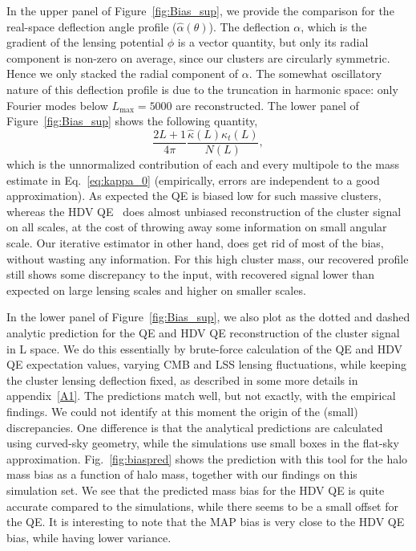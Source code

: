\documentclass[prd, superscriptaddress, tightenlines, longbibliography, nofootinbib, eqsecnum, amsfonts, amsmath, floatfix, twocolumn, notitlepage]{revtex4-2}
\begin{document}
In the upper panel of Figure~\ref{fig:Bias_sup}, we provide the comparison for the real-space deflection angle profile ($\hat \alpha(\theta)$). 
The deflection $\alpha$, which is the gradient of the lensing potential $\phi$ is a vector quantity, but only its radial component is non-zero on average, since our clusters are circularly symmetric. 
Hence we only stacked the radial component of $\alpha$. The somewhat oscillatory nature of this deflection profile is due to the truncation in harmonic space: only Fourier modes below $L_{\text{max}}=5000$ are reconstructed.
The lower panel of Figure~\ref{fig:Bias_sup} shows the following quantity,
\begin{equation}\label{Eq:Int_kappa0}
	\frac{2L + 1}{4\pi} \frac{\hat \kappa(L) \kappa_t(L)}{N(L)},
\end{equation}
which is the unnormalized contribution of each and every multipole to the mass estimate in Eq.~\ref{eq:kappa_0} (empirically, errors are independent to a good approximation). As expected the QE is biased low for such massive clusters, whereas the HDV QE~\cite{Hu:2007bt} does almost unbiased reconstruction of the cluster signal on all scales, at the cost of throwing away some information on small angular scale.
Our iterative estimator in other hand, does get rid of most of the bias, without wasting any information. For this high cluster mass, our recovered profile still shows some discrepancy to the input, with recovered signal lower than expected on large lensing scales and higher on smaller scales.

In the lower panel of Figure~\ref{fig:Bias_sup}, we also plot as the dotted and dashed analytic prediction for the QE and HDV QE reconstruction of the cluster signal in L space.  We do this essentially by brute-force calculation of the QE and HDV QE expectation values, varying CMB and LSS lensing fluctuations, while keeping the cluster lensing deflection fixed, as described in some more details in appendix~\ref{A1}.
The predictions match well, but not exactly, with the empirical findings. 
We could not identify at this moment the origin of the (small) discrepancies. 
One difference is that the analytical predictions are calculated using curved-sky geometry, while the simulations use small boxes in the flat-sky approximation. Fig.~\ref{fig:biaspred} shows the prediction with this tool for the halo mass bias as a function of halo mass, together with our findings on this simulation set. We see that the predicted mass bias for the HDV QE is quite accurate compared to the simulations, while there seems to be a small offset for the QE. It is interesting to note that the MAP bias is very close to the HDV QE bias, while having lower variance.
\end{document}
